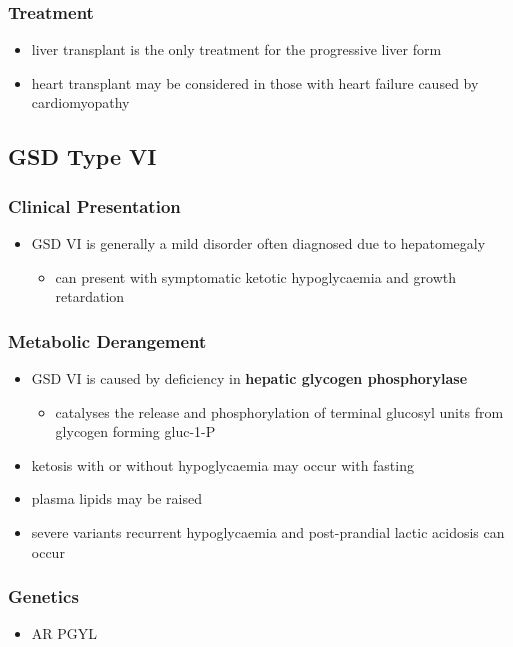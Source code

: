 \documentclass{scrartcl}
\begin{document}
\subsubsection{Treatment}
\label{sec:org57534d3}
\begin{itemize}
\item liver transplant is the only treatment for the progressive liver form
\item heart transplant may be considered in those with heart failure caused by cardiomyopathy
\end{itemize}
\subsection{GSD Type VI}
\label{sec:orgb06649c}
\subsubsection{Clinical Presentation}
\label{sec:org33c0b7d}
\begin{itemize}
\item GSD VI is generally a mild disorder often diagnosed due to hepatomegaly
\begin{itemize}
\item can present with symptomatic ketotic hypoglycaemia and growth retardation
\end{itemize}
\end{itemize}
\subsubsection{Metabolic Derangement}
\label{sec:orgcd9dabc}
\begin{itemize}
\item GSD VI is caused by deficiency in \textbf{hepatic glycogen phosphorylase}
\begin{itemize}
\item catalyses the release and phosphorylation of terminal glucosyl units
from glycogen forming gluc-1-P
\end{itemize}
\item ketosis with or without hypoglycaemia may occur with fasting
\item plasma lipids may be raised
\item severe variants recurrent hypoglycaemia and post-prandial lactic
acidosis can occur
\end{itemize}
\subsubsection{Genetics}
\label{sec:org4d4fb8f}
\begin{itemize}
\item AR PGYL
\end{itemize}
\end{document}
